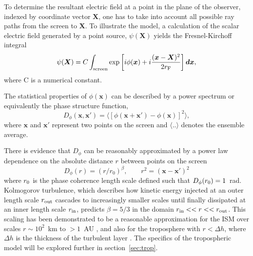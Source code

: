 To determine the resultant electric field at a point in the plane of the observer, indexed by coordinate vector $\bm{X}$, one has to take into account all possible ray paths from the screen to $\bm{X}$. To illustrate the model, a calculation of the scalar electric field generated by a point source, $\psi(\bm{X})$ yields the Fresnel-Kirchoff integral \citep*{BORN_1980}
\begin{equation}\label{Fresnel- Kirchoff}
\psi(\boldsymbol{X}) = C \int_{\rm screen} \exp\left[i\phi(\boldsymbol{x}) + i \frac{(\boldsymbol{x}-\boldsymbol{X})^2}{2 r_{\rm F}}\right]\boldsymbol{dx},
\end{equation}
where C is a numerical constant.

The statistical properties of $\phi(\mathbf{x})$ can be described by a power spectrum or equivalently the phase structure function,
\begin{equation}\label{eq:D_phi}
D_\phi (\mathbf{x},\mathbf{x'}) = \langle \left[ \phi(\mathbf{x} +\mathbf{x'}) - \phi(\mathbf{x})\right]^2 \rangle,
\end{equation}
where $\mathbf{x}$ and $\mathbf{x'} $ represent two points on the screen and $\langle .. \rangle$ denotes the ensemble average. 

There is evidence that $D_\phi$ can be reasonably approximated by a power law dependence on the absolute distance $r$ between points on the screen  \citep{Armstrong_1995,carilli_1997}
\begin{equation}
D_\phi (r) =  (r/r_0)^\beta,\qquad r^2 = (\mathbf{x} - \mathbf{x'})^2
\label{kolmogorov}
\end{equation}
where $r_{\rm 0}$ is the phase coherence length scale defined such that $D_\phi(r_{\rm 0}) = 1$~rad. 
Kolmogorov turbulence, which describes how kinetic energy injected at an outer length scale $r_{\rm out}$ cascades to increasingly smaller scales until finally dissipated at an inner length scale $r_{\rm in}$, predicts $\beta = 5/3$ in the domain ${r_{\rm in}<<r<<r_{\rm out}}$. This scaling has been demonstrated to be a reasonable approximation for the ISM over scales $r \sim 10^2$~km to $>1$~AU \citep*{Johnson_2015a}, and also for the troposphere with $r< \Delta h$, where $\Delta h$ is the thickness of the turbulent layer \cite{Coulman_1985}. The specifics of the tropospheric model will be explored further in section~\ref{sec:trop}.

